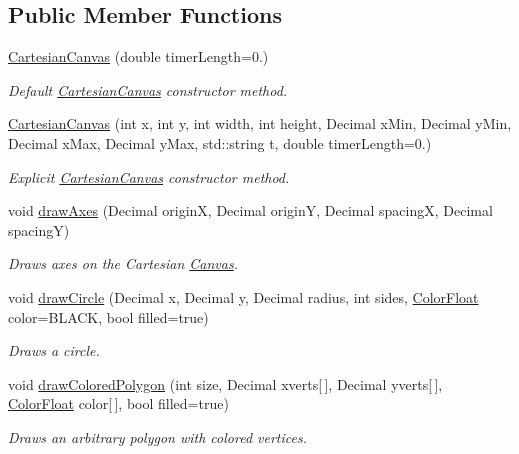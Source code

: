 \subsection*{Public Member Functions}
\begin{DoxyCompactItemize}
\item 
\hyperlink{classtsgl_1_1_cartesian_canvas_a4438f368eae3def6a70e0faa15d28daa}{Cartesian\+Canvas} (double timer\+Length=0.)
\begin{DoxyCompactList}\small\item\em Default \hyperlink{classtsgl_1_1_cartesian_canvas}{Cartesian\+Canvas} constructor method. \end{DoxyCompactList}\item 
\hyperlink{classtsgl_1_1_cartesian_canvas_a7ca80bfa69d89fdbe110a7ec3aa6f100}{Cartesian\+Canvas} (int x, int y, int width, int height, Decimal x\+Min, Decimal y\+Min, Decimal x\+Max, Decimal y\+Max, std\+::string t, double timer\+Length=0.)
\begin{DoxyCompactList}\small\item\em Explicit \hyperlink{classtsgl_1_1_cartesian_canvas}{Cartesian\+Canvas} constructor method. \end{DoxyCompactList}\item 
void \hyperlink{classtsgl_1_1_cartesian_canvas_a1b08e3c0d692603fd2bf56e38eb19907}{draw\+Axes} (Decimal origin\+X, Decimal origin\+Y, Decimal spacing\+X, Decimal spacing\+Y)
\begin{DoxyCompactList}\small\item\em Draws axes on the Cartesian \hyperlink{classtsgl_1_1_canvas}{Canvas}. \end{DoxyCompactList}\item 
void \hyperlink{classtsgl_1_1_cartesian_canvas_a64e128195cbcf9b60dbe478d6f489d67}{draw\+Circle} (Decimal x, Decimal y, Decimal radius, int sides, \hyperlink{structtsgl_1_1_color_float}{Color\+Float} color=B\+L\+A\+C\+K, bool filled=true)
\begin{DoxyCompactList}\small\item\em Draws a circle. \end{DoxyCompactList}\item 
void \hyperlink{classtsgl_1_1_cartesian_canvas_a169f867f6b0d0706dca96a1f4fcc0172}{draw\+Colored\+Polygon} (int size, Decimal xverts\mbox{[}$\,$\mbox{]}, Decimal yverts\mbox{[}$\,$\mbox{]}, \hyperlink{structtsgl_1_1_color_float}{Color\+Float} color\mbox{[}$\,$\mbox{]}, bool filled=true)
\begin{DoxyCompactList}\small\item\em Draws an arbitrary polygon with colored vertices. \end{DoxyCompactList}\item 

\end{DoxyCompactItemize}
